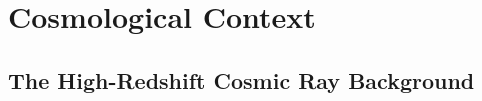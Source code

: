 \section{Cosmological Context}
\label{context}

\subsection{The High-Redshift Cosmic Ray Background}
\label{crb}